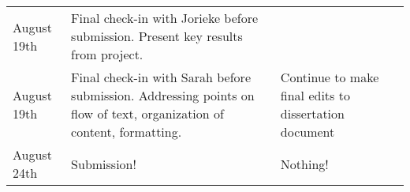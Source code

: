 \begin{singlespace}
\begin{longtable}{|p{2cm}|p{5cm}|p{5cm}}
August 19th             & Final check-in with Jorieke before submission. Present key results from project.                                                                                                                                                                      &                                                                                                                                                                                                                             \\
August 19th             & Final check-in with Sarah before submission. Addressing points on flow of text, organization of content, formatting.                                                                                                                                  & Continue to make final edits to dissertation document                                                                                                                                                                       \\
August 24th             & Submission!                                                                                                                                                                                                                                           & Nothing!                                                                                                                                                                                                                    \\
\hline
\end{longtable}


\end{singlespace}
